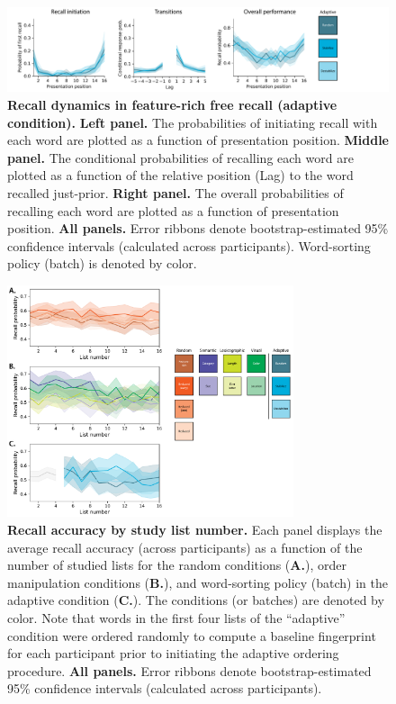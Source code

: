 \documentclass{article}
\begin{document}
\begin{figure}[p] \centering
    \includegraphics[width=\textwidth]{figures/recall_dynamics_adaptive}
    
    \caption{\textbf{Recall dynamics in feature-rich free recall (adaptive
    condition).} \textbf{Left panel.} The probabilities of initiating recall
    with each word are plotted as a function of presentation position.
    \textbf{Middle panel.} The conditional probabilities of recalling each word
    are plotted as a function of the relative position (Lag) to the word
    recalled just-prior. \textbf{Right panel.} The overall probabilities of
    recalling each word are plotted as a function of presentation position.
    \textbf{All panels.} Error ribbons denote bootstrap-estimated 95\%
    confidence intervals (calculated across participants). Word-sorting policy
    (batch) is denoted by color.}
    
        \label{fig:recall-dynamics-adaptive}
    \end{figure}


\begin{figure}[tp] \centering
    \includegraphics[width=0.75\textwidth]{figures/accuracy_by_list}
    
\caption{\textbf{Recall accuracy by study list number.} Each panel displays the
average recall accuracy (across participants) as a function of the number of
studied lists for the random conditions (\textbf{A.}), order manipulation
conditions (\textbf{B.}), and word-sorting policy (batch) in the adaptive
condition (\textbf{C.}). The conditions (or batches) are denoted by color. Note
that words in the first four lists of the ``adaptive'' condition were ordered
randomly to compute a baseline fingerprint for each participant prior to
initiating the adaptive ordering procedure. \textbf{All panels.} Error ribbons
denote bootstrap-estimated 95\% confidence intervals (calculated across
participants).} \label{fig:accuracy-by-list}

\end{figure}
\end{document}

